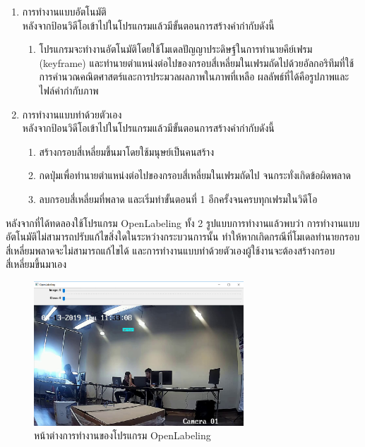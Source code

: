 \begin{enumerate}
	\setlength\itemsep{-0.25em}
	\item การทำงานแบบอัตโนมัติ 
	\\ หลังจากป้อนวิดีโอเข้าไปในโปรแกรมแล้วมีขั้นตอนการสร้างคำกำกับดังนี้ 
   	\begin{enumerate}
	\setlength\itemsep{-0.25em}
		\item โปรแกรมจะทำงานอัตโนมัติโดยใช้โมเดลปัญญาประดิษฐ์ในการทำนายคีย์เฟรม (keyframe) 
		และทำนายตำแหน่งต่อไปของกรอบสี่เหลี่ยมในเฟรมถัดไปด้วยอัลกอริทึมที่ใช้การคำนวณคณิตศาสตร์และการประมวลผลภาพในภาพที่เหลือ ผลลัพธ์ที่ได้คือรูปภาพและไฟล์คำกำกับภาพ
 	\end{enumerate}
	\item การทำงานแบบทำด้วยตัวเอง 
	\\ หลังจากป้อนวิดีโอเข้าไปในโปรแกรมแล้วมีขั้นตอนการสร้างคำกำกับดังนี้ 
	\begin{enumerate}
	\setlength\itemsep{-0.25em}
		\item สร้างกรอบสี่เหลี่ยมขึ้นมาโดยใช้มนุษย์เป็นคนสร้าง
		\item กดปุ่มเพื่อทำนายตำแหน่งต่อไปของกรอบสี่เหลี่ยมในเฟรมถัดไป จนกระทั่งเกิดข้อผิดพลาด
		\item ลบกรอบสี่เหลี่ยมที่พลาด และเริ่มทำขั้นตอนที่ 1 อีกครั้งจนครบทุกเฟรมในวิดีโอ
 	\end{enumerate}
 \end{enumerate}

หลังจากที่ได้ทดลองใช้โปรแกรม OpenLabeling ทั้ง 2 รูปแบบการทำงานแล้วพบว่า การทำงานแบบอัตโนมัติไม่สามารถปรับแก้ไขสิ่งใดในระหว่างกระบวนการนั้น 
ทำให้หากเกิดกรณีที่โมเดลทำนายกรอบสี่เหลี่ยมพลาดจะไม่สามารถแก้ไขได้ และการทำงานแบบทำด้วยตัวเองผู้ใช้งานจะต้องสร้างกรอบสี่เหลี่ยมขึ้นมาเอง

\begin{figure}[!ht]
	\centering
	\includegraphics[width=0.7\textwidth]{chapter2/images/openlabel.png}
		\caption{หน้าต่างการทำงานของโปรแกรม OpenLabeling}
    	\label{fig:openlabel}
\end{figure}


